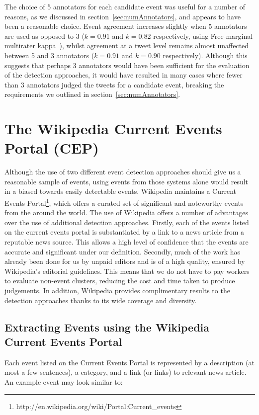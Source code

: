 The choice of 5 annotators for each candidate event was useful for a number of reasons, as we discussed in section~\ref{sec:numAnnotators}, and appears to have been a reasonable choice.
Event agreement increases slightly when 5 annotators are used as opposed to 3 (\(k = 0.91\) and \(k = 0.82\) respectively, using Free-marginal multirater kappa~\citep{Randolph}), whilst agreement at a tweet level remains almost unaffected between 5 and 3 annotators (\(k = 0.91\) and \(k = 0.90\) respectively).
Although this suggests that perhaps 3 annotators would have been sufficient for the evaluation of the detection approaches, it would have resulted in many cases where fewer than 3 annotators judged the tweets for a candidate event, breaking the requirements we outlined in section~\ref{sec:numAnnotators}.

\section{The Wikipedia Current Events Portal (CEP)}
Although the use of two different event detection approaches should give us a reasonable sample of events, using events from those systems alone would result in a biased towards easily detectable events.
Wikipedia maintains a Current Events Portal\footnote{http://en.wikipedia.org/wiki/Portal:Current\_events}, which offers a curated set of significant and noteworthy events from the around the world.
The use of Wikipedia offers a number of advantages over the use of additional detection approaches.
Firstly, each of the events listed on the current events portal is substantiated by a link to a news article from a reputable news source.
This allows a high level of confidence that the events are accurate and significant under our definition.
Secondly, much of the work has already been done for us by unpaid editors and is of a high quality, ensured by Wikipedia's editorial guidelines.
This means that we do not have to pay workers to evaluate non-event clusters, reducing the cost and time taken to produce judgements.
In addition, Wikipedia provides complimentary results to the detection approaches thanks to its wide coverage and diversity.

\subsection{Extracting Events using the Wikipedia Current Events Portal}
Each event listed on the Current Events Portal is represented by a description (at most a few sentences), a category, and a link (or links) to relevant news article.
An example event may look similar to:

